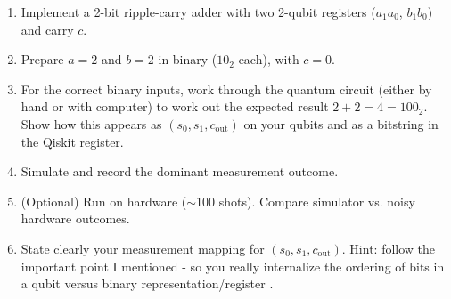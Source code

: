 \documentclass[11pt]{article}
\begin{document}
\begin{enumerate}[label=(\alph*)]
  \item Implement a 2-bit ripple-carry adder with two 2-qubit registers ($a_1a_0$, $b_1b_0$) and carry $c$.
  \item Prepare $a=2$ and $b=2$ in binary ($10_2$ each), with $c=0$.
  \item For the correct binary inputs, work through the quantum circuit (either by hand or with computer) to work out the expected result $2+2=4=100_2$. Show how this appears as $(s_0,s_1,c_{\text{out}})$ on your qubits and as a bitstring in the Qiskit register.
  \item Simulate and record the dominant measurement outcome.
  \item (Optional) Run on hardware ($\sim$100 shots). Compare simulator vs. noisy hardware outcomes.
  \item State clearly your measurement mapping for $(s_0,s_1,c_{\text{out}})$. Hint: follow the important point I mentioned  - so you really internalize the ordering of bits in a qubit versus binary representation/register \smiley{}.
\end{enumerate}
\end{document}
